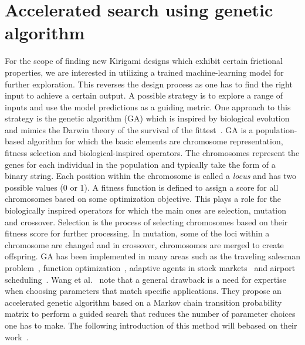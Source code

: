 \section{Accelerated search using genetic algorithm}\label{sec:GA}
For the scope of finding new Kirigami designs which exhibit certain frictional properties, we are interested in utilizing a trained machine-learning model for further exploration. This reverses the design process as one has to find the right input to achieve a certain output. A possible strategy is to explore a range of inputs and use the model predictions as a guiding metric. One approach to this strategy is the genetic algorithm (\acrshort{GA}) which is inspired by biological evolution and mimics the Darwin theory of the survival of the fittest~\cite{katoch_review_2021}. \acrshort{GA} is a population-based algorithm for
which the basic elements are chromosome representation, fitness selection and
biological-inspired operators. The chromosomes represent the genes for each
individual in the population and typically take the form of a binary string.
Each position within the chromosome is called a \textit{locus} and has two
possible values (0 or 1). A fitness function is defined to assign a score for
all chromosomes based on some optimization objective. This plays a role for the
biologically inspired operators for which the main ones are selection, mutation
and crossover. Selection is the process of selecting chromosomes based on their
fitness score for further processing. In mutation, some of the loci within a
chromosome are changed and in crossover, chromosomes are merged to create
offspring. \acrshort{GA} has been implemented in many areas such as the traveling salesman problem~\cite{jiang2000distributed}, function optimization~\cite{szeto1998effects}, adaptive agents in stock markets~\cite{szeto2000adaptive} and airport scheduling~\cite{shiu2008self}. Wang et al.~\cite{Wang2010} note that a general drawback is a need for expertise when choosing parameters that match specific applications. They propose an accelerated genetic algorithm based on a Markov chain transition probability matrix to perform a guided search that reduces the number of parameter choices one has to make. The following introduction of this method will bebased on their work~\cite{Wang2010}.

